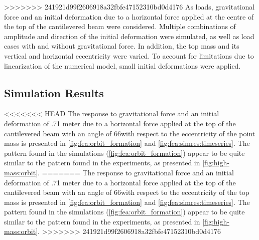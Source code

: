 \documentclass{article}
\begin{document}
>>>>>>> 241921d99f2606918a32fbfe47152310bd0d4176
As loads, gravitational force and an initial deformation due to a horizontal force applied at the centre of the top of the cantilevered beam were considered. Multiple combinations of amplitude and direction of the initial deformation were simulated, as well as load cases with and without gravitational force. In addition, the top mass and its vertical and horizontal eccentricity were varied. To account for limitations due to linearization of the numerical model, small initial deformations were applied.

\subsection{Simulation Results}

<<<<<<< HEAD
The response to gravitational force and an initial deformation of .71 meter due to a horizontal force applied at the top of the  cantilevered beam with an angle of 66\textdegree with respect to the eccentricity of the point mass is presented in  \autoref{fig:fea:orbit_formation} and \autoref{fig:fea:simres:timeseries}. The pattern found in the simulations (\autoref{fig:fea:orbit_formation}) appear to be quite similar to the pattern found in the experiments, as presented in  \autoref{fig:high-mass:orbit}.
=======
The response to gravitational force and an initial deformation of .71 meter due to a horizontal force applied at the top of the  cantilevered beam with an angle of 66\textdegree with respect to the eccentricity of the top mass is presented in  \autoref{fig:fea:orbit_formation} and \autoref{fig:fea:simres:timeseries}. The pattern found in the simulations (\autoref{fig:fea:orbit_formation}) appear to be quite similar to the pattern found in the experiments, as presented in  \autoref{fig:high-mass:orbit}.
>>>>>>> 241921d99f2606918a32fbfe47152310bd0d4176
\end{document}
